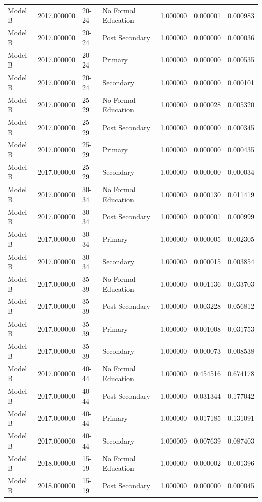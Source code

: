\begin{table}[ht]
\begin{tabular}{lrllrrr}
Model B & 2017.000000 & 20-24 & No Formal Education & 1.000000 & 0.000001 & 0.000983 \\
Model B & 2017.000000 & 20-24 & Post Secondary & 1.000000 & 0.000000 & 0.000036 \\
Model B & 2017.000000 & 20-24 & Primary & 1.000000 & 0.000000 & 0.000535 \\
Model B & 2017.000000 & 20-24 & Secondary & 1.000000 & 0.000000 & 0.000101 \\
Model B & 2017.000000 & 25-29 & No Formal Education & 1.000000 & 0.000028 & 0.005320 \\
Model B & 2017.000000 & 25-29 & Post Secondary & 1.000000 & 0.000000 & 0.000345 \\
Model B & 2017.000000 & 25-29 & Primary & 1.000000 & 0.000000 & 0.000435 \\
Model B & 2017.000000 & 25-29 & Secondary & 1.000000 & 0.000000 & 0.000034 \\
Model B & 2017.000000 & 30-34 & No Formal Education & 1.000000 & 0.000130 & 0.011419 \\
Model B & 2017.000000 & 30-34 & Post Secondary & 1.000000 & 0.000001 & 0.000999 \\
Model B & 2017.000000 & 30-34 & Primary & 1.000000 & 0.000005 & 0.002305 \\
Model B & 2017.000000 & 30-34 & Secondary & 1.000000 & 0.000015 & 0.003854 \\
Model B & 2017.000000 & 35-39 & No Formal Education & 1.000000 & 0.001136 & 0.033703 \\
Model B & 2017.000000 & 35-39 & Post Secondary & 1.000000 & 0.003228 & 0.056812 \\
Model B & 2017.000000 & 35-39 & Primary & 1.000000 & 0.001008 & 0.031753 \\
Model B & 2017.000000 & 35-39 & Secondary & 1.000000 & 0.000073 & 0.008538 \\
Model B & 2017.000000 & 40-44 & No Formal Education & 1.000000 & 0.454516 & 0.674178 \\
Model B & 2017.000000 & 40-44 & Post Secondary & 1.000000 & 0.031344 & 0.177042 \\
Model B & 2017.000000 & 40-44 & Primary & 1.000000 & 0.017185 & 0.131091 \\
Model B & 2017.000000 & 40-44 & Secondary & 1.000000 & 0.007639 & 0.087403 \\
Model B & 2018.000000 & 15-19 & No Formal Education & 1.000000 & 0.000002 & 0.001396 \\
Model B & 2018.000000 & 15-19 & Post Secondary & 1.000000 & 0.000000 & 0.000045 \\

\end{tabular}
\end{table}
